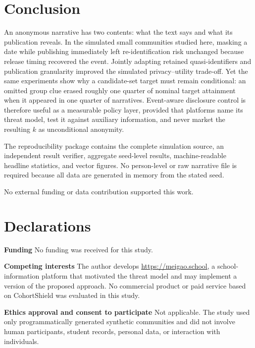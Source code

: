 \documentclass[pdflatex,sn-mathphys-num]{sn-jnl}
\theoremstyle{plain}
\begin{document}
\section{Conclusion}\label{sec:conclusion}

An anonymous narrative has two contents: what the text says and what its publication reveals. In the simulated small communities studied here, masking a date while publishing immediately left re-identification risk unchanged because release timing recovered the event. Jointly adapting retained quasi-identifiers and publication granularity improved the simulated privacy--utility trade-off. Yet the same experiments show why a candidate-set target must remain conditional: an omitted group clue erased roughly one quarter of nominal target attainment when it appeared in one quarter of narratives. Event-aware disclosure control is therefore useful as a measurable policy layer, provided that platforms name its threat model, test it against auxiliary information, and never market the resulting $k$ as unconditional anonymity.

\backmatter


The reproducibility package contains the complete simulation source, an independent result verifier, aggregate seed-level results, machine-readable headline statistics, and vector figures. No person-level or raw narrative file is required because all data are generated in memory from the stated seed.


No external funding or data contribution supported this work.

\section*{Declarations}

\textbf{Funding} No funding was received for this study.

\textbf{Competing interests} The author develops \url{https://meigao.school}, a school-information platform that motivated the threat model and may implement a version of the proposed approach. No commercial product or paid service based on CohortShield was evaluated in this study.

\textbf{Ethics approval and consent to participate} Not applicable. The study used only programmatically generated synthetic communities and did not involve human participants, student records, personal data, or interaction with individuals.
\end{document}
